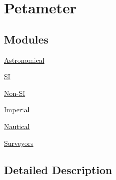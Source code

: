 \hypertarget{group___e_g_x_math-_conversions-_length_conversions-_petameter}{}\section{Petameter}
\label{group___e_g_x_math-_conversions-_length_conversions-_petameter}
\subsection*{Modules}
\begin{DoxyCompactItemize}
\item 
\mbox{\hyperlink{group___e_g_x_math-_conversions-_length_conversions-_petameter-_astronomical}{Astronomical}}
\item 
\mbox{\hyperlink{group___e_g_x_math-_conversions-_length_conversions-_petameter-_s_i}{SI}}
\item 
\mbox{\hyperlink{group___e_g_x_math-_conversions-_length_conversions-_petameter-_non-_s_i}{Non-\/\+SI}}
\item 
\mbox{\hyperlink{group___e_g_x_math-_conversions-_length_conversions-_petameter-_imperial}{Imperial}}
\item 
\mbox{\hyperlink{group___e_g_x_math-_conversions-_length_conversions-_petameter-_nautical}{Nautical}}
\item 
\mbox{\hyperlink{group___e_g_x_math-_conversions-_length_conversions-_petameter-_surveyors}{Surveyors}}
\end{DoxyCompactItemize}


\subsection{Detailed Description}
